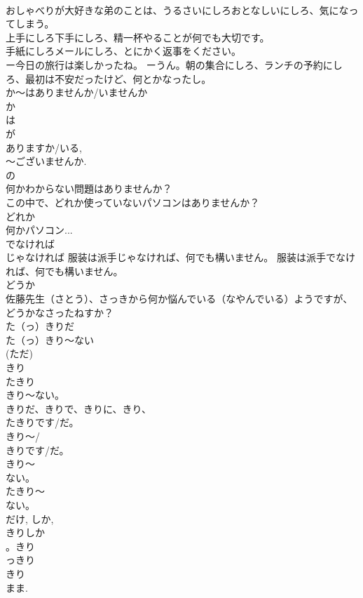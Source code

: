 \documentclass[8pt]{extreport}
\begin{document}
\begin{CJK}{UTF8}{min}
\\	おしゃべりが大好きな弟のことは、うるさいにしろおとなしいにしろ、気になってしまう。 
\\	上手にしろ下手にしろ、精一杯やることが何でも大切です。 
\\	手紙にしろメールにしろ、とにかく返事をください。 
\\	ー今日の旅行は楽しかったね。 ーうん。朝の集合にしろ、ランチの予約にしろ、最初は不安だったけど、何とかなったし。
\\	か～はありませんか/いませんか	
\\	か 
\\	は 
\\	が 
\\	ありますか/いる, 
\\	～ございませんか. 
\\	の
\\	何かわからない問題はありませんか？ 
\\	この中で、どれか使っていないパソコンはありませんか？ 
\\	どれか 
\\	何かパソコン...
\\	でなければ	
\\	じゃなければ 服装は派手じゃなければ、何でも構いません。 服装は派手でなければ、何でも構いません。 
\\	どうか	
\\	佐藤先生（さとう）、さっきから何か悩んでいる（なやんでいる）ようですが、どうかなさったねすか？
\\	た（っ）きりだ 
\\	た（っ）きり～ない	
\\	(ただ)
\\	きり 
\\	たきり 
\\	きり～ない。 
\\	きりだ、きりで、きりに、きり、 
\\	たきりです/だ。　
\\	きり～/
\\	きりです/だ。 
\\	きり～
\\	ない。 
\\	たきり～
\\	ない。 
\\	だけ, しか, 
\\	きりしか
\\	。きり 
\\	っきり 
\\	きり 
\\	まま. 

\end{CJK}
\end{document}
